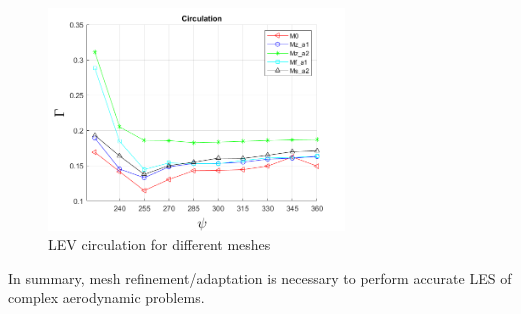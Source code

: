 \begin{figure}[H]
\centering
\includegraphics[width=0.7\textwidth]{figures/Results/circulation.png}
\caption{LEV circulation for different meshes}
\label{fig:circulation}
\end{figure}

In summary, mesh refinement/adaptation is necessary to perform accurate LES of complex aerodynamic problems.
